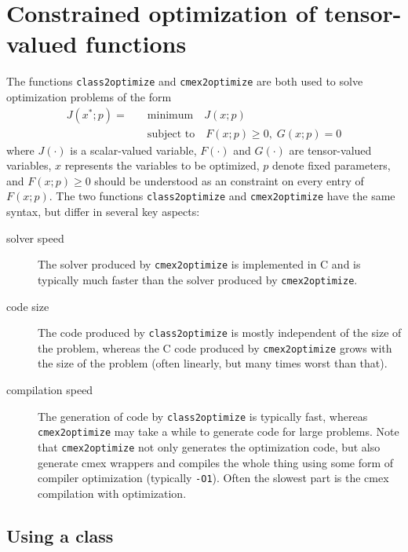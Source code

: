 \documentclass[11pt]{article}
\theoremstyle{remark}
\begin{document}
\section{Constrained optimization of tensor-valued functions}
\label{se:optimization}

The functions \lstinline{class2optimize} and \lstinline{cmex2optimize}
are both used to solve optimization problems of the form
\begin{align}\label{eq:optimization}
  J(x^*;p) = \quad &\text{minimum} \quad J(x;p)\\
             &\text{subject to} \quad F(x;p)\ge 0, \; G(x;p)=0
\end{align}
where $J(\cdot)$ is a scalar-valued variable, $F(\cdot)$ and
$G(\cdot)$ are tensor-valued variables, $x$ represents the variables to be
optimized, $p$ denote fixed parameters, and $F(x;p)\ge 0$ should be
understood as an constraint on every entry of $F(x;p)$. The two
functions \lstinline{class2optimize} and \lstinline{cmex2optimize}
have the same syntax, but differ in several key aspects:
\begin{description}
\item[solver speed] The solver produced by \lstinline{cmex2optimize}
  is implemented in C and is typically much faster than the \matlab{}
  solver produced by \lstinline{cmex2optimize}.

\item[code size] The \matlab{} code produced by
  \lstinline{class2optimize} is mostly independent of the size of the
  problem, whereas the C code produced by \lstinline{cmex2optimize}
  grows with the size of the problem (often linearly, but many times
  worst than that).

\item[compilation speed] The generation of \matlab{} code by
  \lstinline{class2optimize} is typically fast, whereas
  \lstinline{cmex2optimize} may take a while to generate code for
  large problems. Note that \lstinline{cmex2optimize} not only
  generates the optimization code, but also generate cmex wrappers and
  compiles the whole thing using some form of compiler optimization
  (typically \lstinline{-O1}). Often the slowest part is the cmex
  compilation with optimization.
\end{description}

\subsection{Using a \matlab{} class}\label{se:optimization-matlab}
\end{document}
